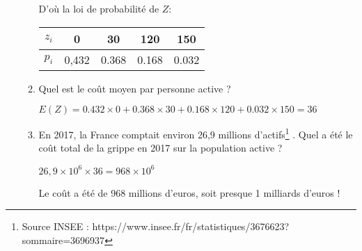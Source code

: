 \documentclass[12pt]{cornouaille}
\begin{document}
\begin{exercice}
\begin{enumerate}
\begin{enumerate}
\begin{solution}
D'où la loi de probabilité de $Z$:


\begin{tabular}{|c|c|c|c|c|}
\hline
$z_i$ & 0     & 30    & 120   & 150   \\ \hline
$p_i$ & 0,432 & 0.368 & 0.168 & 0.032 \\ \hline
\end{tabular}

\end{solution}
  \item Quel est le coût moyen par personne active ?

\begin{solution}
$E(Z) = 0.432 \times 0+0.368 \times 30+0.168 \times 120+0.032 \times 150=36$
\end{solution}


  \item En 2017, la France comptait environ 26,9 millions d'actifs\footnote{Source INSEE : https://www.insee.fr/fr/statistiques/3676623?sommaire=3696937} . Quel a été le coût total de la grippe en 2017 sur la population active ?

\begin{solution}
$26,9 \times 10^6 \times 36=968 \times 10^6$

Le coût a été de 968 millions d'euros, soit presque 1 milliards d'euros !
\end{solution}

  \end{enumerate}


\end{enumerate}

	
\end{exercice}
\end{document}
